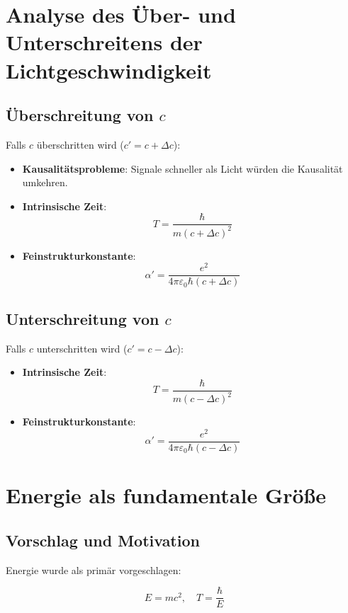 \documentclass{article}
\begin{document}
	\section{Analyse des Über- und Unterschreitens der Lichtgeschwindigkeit}
	
	\subsection{Überschreitung von \( c \)}
	
	Falls \( c \) überschritten wird (\( c' = c + \Delta c \)):
	
	\begin{itemize}
		\item \textbf{Kausalitätsprobleme}: Signale schneller als Licht würden die Kausalität umkehren.
		\item \textbf{Intrinsische Zeit}:
		\[
		T = \frac{\hbar}{m (c + \Delta c)^2}
		\]
		\item \textbf{Feinstrukturkonstante}:
		\[
		\alpha' = \frac{e^2}{4\pi \varepsilon_0 \hbar (c + \Delta c)}
		\]
	\end{itemize}
	
	\subsection{Unterschreitung von \( c \)}
	
	Falls \( c \) unterschritten wird (\( c' = c - \Delta c \)):
	
	\begin{itemize}
		\item \textbf{Intrinsische Zeit}:
		\[
		T = \frac{\hbar}{m (c - \Delta c)^2}
		\]
		\item \textbf{Feinstrukturkonstante}:
		\[
		\alpha' = \frac{e^2}{4\pi \varepsilon_0 \hbar (c - \Delta c)}
		\]
	\end{itemize}
	
	\section{Energie als fundamentale Größe}
	
	\subsection{Vorschlag und Motivation}
	
	Energie wurde als primär vorgeschlagen:
	
	\[
	E = mc^2, \quad T = \frac{\hbar}{E}
	\]
	
\end{document}
